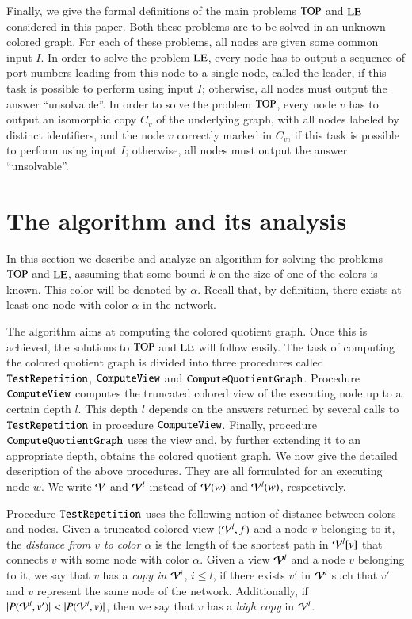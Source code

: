 \documentclass[a4paper,10pt]{article}
\newcommand{\view}[1][]{\if!#1!\mathcal{V}\else\mathcal{V}^{#1}\fi}
\newcommand{\viewPath}[3][]{\if!#1! P(#2,#3)\else P(#2,#1,#3)\fi}  \newcommand{\ourColor}{\alpha}
\newcommand{\algorithmQuotient}{\textup{\texttt{ComputeQuotientGraph}}}
\newcommand{\algorithmView}{\textup{\texttt{ComputeView}}}
\newcommand{\algorithmTest}{\textup{\texttt{TestRepetition}}}
\newcommand{\problemLE}{\textup{LE}}
\newcommand{\problemTOP}{\textup{TOP}}
\begin{document}
Finally, we give the formal definitions of the main problems $\problemTOP$ and $\problemLE$ considered in this paper. Both these problems are to be solved in an unknown colored graph.
For each of these problems, all nodes are given some common input $I$.
In order to solve the problem $\problemLE$, every node has to output a sequence of port numbers leading from this node to a single node, called the leader, if this task is possible to perform using input $I$;
otherwise, all nodes must output the answer ``unsolvable''. In order to solve the problem $\problemTOP$, every node $v$ has to output an isomorphic copy $C_v$ of the underlying graph, with all nodes labeled by distinct identifiers, and the node $v$ correctly marked in $C_v$,  if this task is possible to perform using input $I$;
otherwise, all nodes must output the answer ``unsolvable''.


\section{The algorithm and its analysis}  \label{sec:algorithm}

In this section we describe and analyze an algorithm for solving the problems $\problemTOP$ and $\problemLE$, assuming that some bound $k$ on the size of one of the colors is known.
This color will be denoted by $\ourColor$.
Recall that, by definition, there exists at least one node with color $\ourColor$ in the network.

The algorithm aims at computing the colored quotient graph.
Once this is achieved, the solutions to $\problemTOP$ and $\problemLE$ will follow easily.
The task of computing the colored quotient graph is divided into three procedures called $\algorithmTest$, $\algorithmView$ and $\algorithmQuotient$.
Procedure $\algorithmView$ computes the truncated colored view of the executing node up to a certain depth $l$.
This depth $l$ depends on the answers returned by several calls to $\algorithmTest$ in procedure $\algorithmView$.
Finally, procedure $\algorithmQuotient$ uses the view and, by further extending it to an appropriate depth, obtains the colored quotient graph.
We now give the detailed description of the above procedures.
They are all formulated for an executing node $w$.
We write $\view$ and $\view[l]$ instead of $\view(w)$ and $\view[l](w)$, respectively.

\medskip
Procedure $\algorithmTest$ uses the following notion of distance between colors and nodes.
Given a truncated colored view $(\view[l],f)$ and a node $v$ belonging to it, the \emph{distance from $v$ to color $\ourColor$} is the length of the shortest path in $\view[l][v]$ that connects $v$ with some node with color $\ourColor$.
Given a view $\view[l]$ and a node $v$ belonging to it, we say that $v$ has a \emph{copy in} $\view[i]$, $i\leq l$, if there exists $v'$ in $\view[i]$ such that $v'$ and $v$ represent the same node of the network.
Additionally, if $|\viewPath{\view[l]}{v'}|<|\viewPath{\view[l]}{v}|$, then we say that $v$ has a \emph{high copy} in $\view[l]$.
\end{document}
